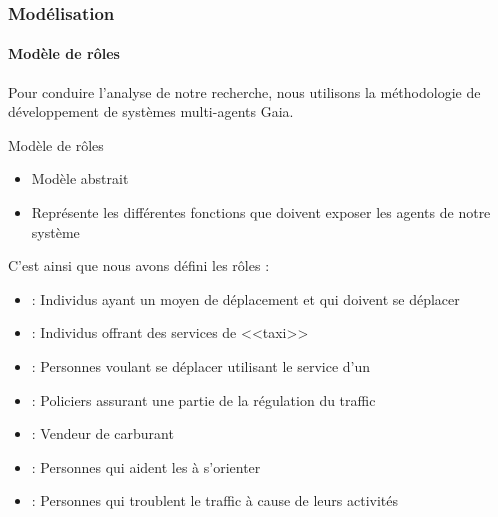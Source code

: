 \begin{frame}
    \frametitle{Modélisation}
    \framesubtitle{Modèle de rôles}
    Pour conduire l'analyse de notre recherche, nous utilisons la méthodologie de développement de systèmes multi-agents Gaia.
    \begin{block}{Modèle de rôles}
        \begin{itemize}
            \item Modèle abstrait
            \item Représente les différentes fonctions que doivent exposer les agents de notre système
        \end{itemize}
    \end{block}

    \pause{}
    C'est ainsi que nous avons défini les rôles :

    \begin{itemize}
        \item \rConducteur{}: Individus ayant un moyen de déplacement et qui doivent se déplacer
        \item \rTaxi{}: Individus offrant des services de <<taxi>>
        \item \rPieton{}: Personnes voulant se déplacer utilisant le service d'un \rTaxi{}
        \item \rPolicier{}: Policiers assurant une partie de la régulation du traffic
        \item \rVCarburant{}: Vendeur de carburant
        \item \rGps{}: Personnes qui aident les \rConducteur{} à s'orienter
        \item \rPertubateur{}: Personnes qui troublent le traffic à cause de leurs activités
    \end{itemize}

%    
\end{frame}

